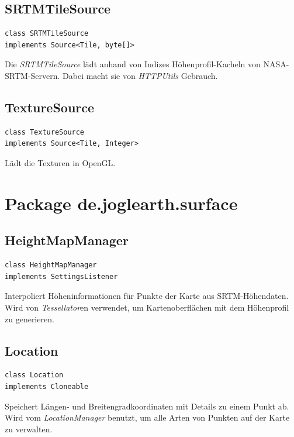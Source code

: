 \documentclass[10pt]{scrreprt}
\begin{document}
\subsection*{SRTMTileSource}
\begin{lstlisting}
class SRTMTileSource
implements Source<Tile, byte[]>
\end{lstlisting}
Die \textit{SRTMTileSource} lädt anhand von Indizes Höhenprofil-Kacheln von NASA-SRTM-Servern. Dabei macht sie von \textit{HTTPUtils} Gebrauch.\\

\vspace{5mm}
\subsection*{TextureSource}
\begin{lstlisting}
class TextureSource
implements Source<Tile, Integer>
\end{lstlisting}
Lädt die Texturen in OpenGL.\\



\vspace{5mm}
\section{Package de.joglearth.surface}
\subsection*{HeightMapManager}
\begin{lstlisting}
class HeightMapManager
implements SettingsListener
\end{lstlisting}
Interpoliert Höheninformationen für Punkte der Karte aus SRTM-Höhendaten. Wird von \textit{Tessellator}en verwendet, um Kartenoberflächen mit dem Höhenprofil zu generieren.\\

\vspace{5mm}
\subsection*{Location}
\begin{lstlisting}
class Location
implements Cloneable
\end{lstlisting}
Speichert Längen- und Breitengradkoordinaten mit Details zu einem Punkt ab. Wird vom \textit{LocationManager} benutzt, um alle Arten von Punkten auf der Karte zu verwalten.\\
\end{document}
